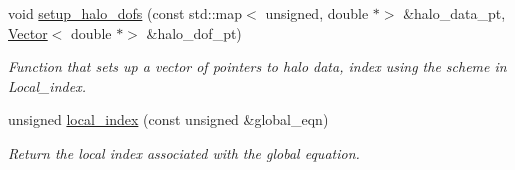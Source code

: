 \begin{DoxyCompactItemize}
void \hyperlink{classoomph_1_1DoubleVectorHaloScheme_a7781f9e1b943655083ade4bf3b6b19a0}{setup\+\_\+halo\+\_\+dofs} (const std\+::map$<$ unsigned, double $\ast$$>$ \&halo\+\_\+data\+\_\+pt, \hyperlink{classoomph_1_1Vector}{Vector}$<$ double $\ast$$>$ \&halo\+\_\+dof\+\_\+pt)
\begin{DoxyCompactList}\small\item\em Function that sets up a vector of pointers to halo data, index using the scheme in Local\+\_\+index. \end{DoxyCompactList}\item 
unsigned \hyperlink{classoomph_1_1DoubleVectorHaloScheme_ad589a203cdd37bc2508930d8db845a49}{local\+\_\+index} (const unsigned \&global\+\_\+eqn)
\begin{DoxyCompactList}\small\item\em Return the local index associated with the global equation. \end{DoxyCompactList}\end{DoxyCompactItemize}
